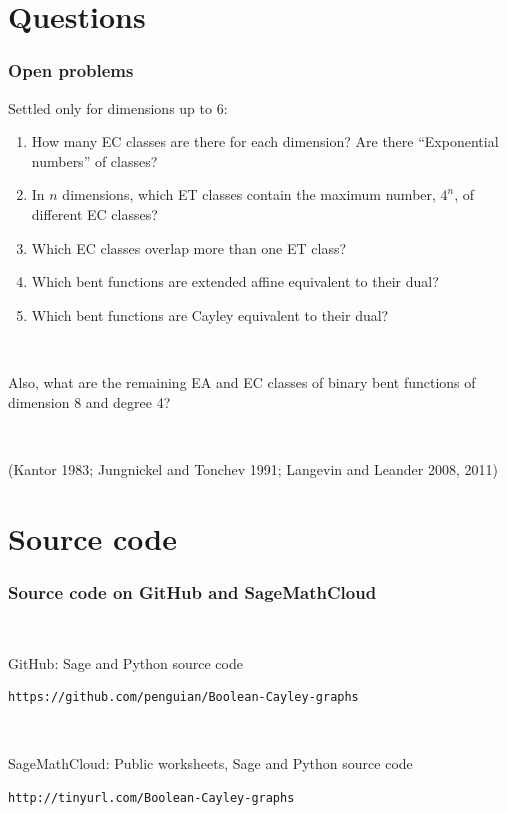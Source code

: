 \documentclass[pdf,sprung,slideColor,nocolorBG]{beamer}
\newenvironment{colortheme}[1]{
\def\ProvidesPackageRCS $##1${\relax}
\renewcommand{\ProcessOptions}{\relax}
\makeatletter

\makeatother
}{}
\newcommand{\slidecite}[1]{\tiny{(#1)}\normalsize{}}
\begin{document}
\begin{colortheme}{jubata}
\section{Questions}
\begin{frame}
\frametitle{Open problems}
Settled only for dimensions up to 6:
\begin{enumerate}
\item
How many EC classes are there for each dimension?
Are there ``Exponential numbers'' of classes?
\item
In $n$ dimensions,
which ET classes contain the maximum number, $4^n$, of different EC classes?
\item
Which EC classes overlap more than one ET class?
\item
Which bent functions are extended affine equivalent to their dual?
\item
Which bent functions are Cayley equivalent to their dual?
\end{enumerate}
~

Also, what are the remaining EA and EC classes of binary bent functions of dimension 8 and degree 4?

~

\slidecite{Kantor 1983; Jungnickel and Tonchev 1991; Langevin and Leander 2008, 2011}
\end{frame}
\end{colortheme}
\section{Source code}
\begin{colortheme}{jubata}
\begin{frame}[fragile]
\frametitle{Source code on GitHub and SageMathCloud}
~

GitHub: Sage and Python source code

\begin{verbatim}
https://github.com/penguian/Boolean-Cayley-graphs
\end{verbatim}

~

SageMathCloud: Public worksheets, Sage and Python source code

\begin{verbatim}
http://tinyurl.com/Boolean-Cayley-graphs
\end{verbatim}

\end{frame}
\end{colortheme}
\end{document}

